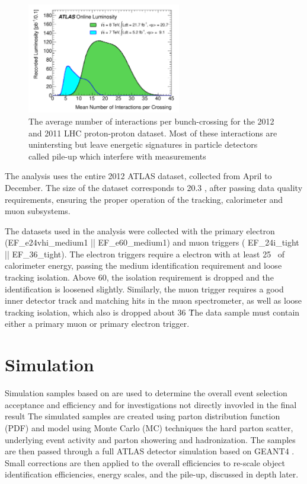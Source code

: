 \begin{figure}[!t]
\centering 
\includegraphics[width=0.60\textwidth]{figs/mu_2011_2012-dec.pdf}
\caption{ The average number of interactions per bunch-crossing for the 2012 and 2011 LHC proton-proton dataset. Most of these interactions are unintersting but leave energetic signatures in particle detectors called pile-up which interfere with measurements}\label{figure:data_pileup}
\end{figure} 

The \tth analysis uses the entire 2012 ATLAS dataset, collected
from April to December. The size of the dataset corresponds to 20.3 \ifb, after passing data quality
requirements, ensuring the proper operation of the tracking, calorimeter and muon subsystems.  

The datasets used in the analysis were collected with the primary electron
(EF\_e24vhi\_medium1 || EF\_e60\_medium1) and muon triggers (
    EF\_24i\_tight || EF\_36\_tight). The electron triggers require a electron
with at least 25 \gev\ of calorimeter energy, passing the medium identification
requirement and loose tracking isolation.  Above 60\gev, the isolation
requirement is dropped and the identification is loosened slightly. Similarly,
            the muon trigger requires a good inner detector track and matching
            hits in the muon spectrometer, as well as loose tracking isolation,
            which also is dropped about 36 \gev\.  The data sample must contain
            either a primary muon or primary electron trigger. 

\section{Simulation}

Simulation samples based on are used to determine the 
overall event selection acceptance and efficiency and for investigations not directly invovled
in the final result The simulated samples are created using parton distribution function (PDF) and
model using Monte Carlo (MC) techniques the hard parton scatter, underlying event activity and parton showering and hadronization. 
The samples are then passed through a full ATLAS detector simulation\cite{Aad:2010ah} based on  GEANT4 \cite{Agostinelli:2002hh}.
Small corrections are then applied to the overall efficiencies to re-scale object identification efficiencies,
      energy scales, and the pile-up, discussed in depth later.  

